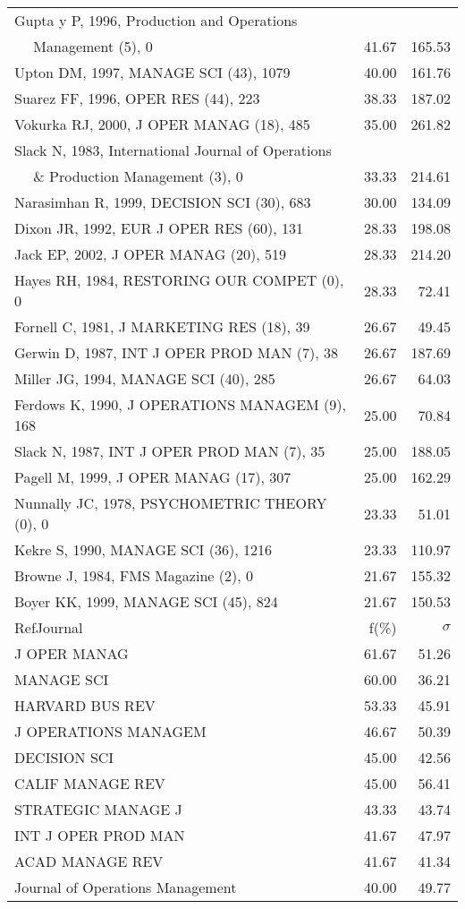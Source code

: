 \documentclass[a4paper,11pt]{report}
\begin{document}
\begin{landscape}
\begin{table}[!ht]
{\begin{tabular}{|l r r|}
Gupta y P, 1996, Production and Operations &  & \\
$\quad$ Management (5), 0 & 41.67 & 165.53\\
Upton DM, 1997, MANAGE SCI (43), 1079 & 40.00 & 161.76\\
Suarez FF, 1996, OPER RES (44), 223 & 38.33 & 187.02\\
Vokurka RJ, 2000, J OPER MANAG (18), 485 & 35.00 & 261.82\\
Slack N, 1983, International Journal of Operations &  & \\
$\quad$ \& Production Management (3), 0 & 33.33 & 214.61\\
Narasimhan R, 1999, DECISION SCI (30), 683 & 30.00 & 134.09\\
Dixon JR, 1992, EUR J OPER RES (60), 131 & 28.33 & 198.08\\
Jack EP, 2002, J OPER MANAG (20), 519 & 28.33 & 214.20\\
Hayes RH, 1984, RESTORING OUR COMPET (0), 0 & 28.33 & 72.41\\
Fornell C, 1981, J MARKETING RES (18), 39 & 26.67 & 49.45\\
Gerwin D, 1987, INT J OPER PROD MAN (7), 38 & 26.67 & 187.69\\
Miller JG, 1994, MANAGE SCI (40), 285 & 26.67 & 64.03\\
Ferdows K, 1990, J OPERATIONS MANAGEM (9), 168 & 25.00 & 70.84\\
Slack N, 1987, INT J OPER PROD MAN (7), 35 & 25.00 & 188.05\\
Pagell M, 1999, J OPER MANAG (17), 307 & 25.00 & 162.29\\
Nunnally JC, 1978, PSYCHOMETRIC THEORY (0), 0 & 23.33 & 51.01\\
Kekre S, 1990, MANAGE SCI (36), 1216 & 23.33 & 110.97\\
Browne J, 1984, FMS Magazine (2), 0 & 21.67 & 155.32\\
Boyer KK, 1999, MANAGE SCI (45), 824 & 21.67 & 150.53\\
\hline
\hline
RefJournal & f(\%) & $\sigma$\\
\hline
J OPER MANAG & 61.67 & 51.26\\
MANAGE SCI & 60.00 & 36.21\\
HARVARD BUS REV & 53.33 & 45.91\\
J OPERATIONS MANAGEM & 46.67 & 50.39\\
DECISION SCI & 45.00 & 42.56\\
CALIF MANAGE REV & 45.00 & 56.41\\
STRATEGIC MANAGE J & 43.33 & 43.74\\
INT J OPER PROD MAN & 41.67 & 47.97\\
ACAD MANAGE REV & 41.67 & 41.34\\
Journal of Operations Management & 40.00 & 49.77\\
\hline
\end{tabular}
}
\end{table}


\end{landscape}
\end{document}
